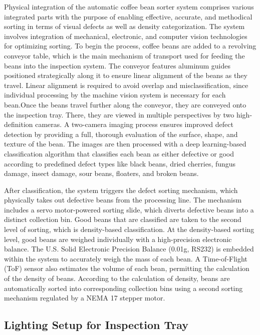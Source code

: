 Physical integration of the automatic coffee bean sorter system comprises various integrated parts with the purpose of enabling effective, accurate, and methodical sorting in terms of visual defects as well as density categorization. The system involves integration of mechanical, electronic, and computer vision technologies for optimizing sorting. To begin the process, coffee beans are added to a revolving conveyor table, which is the main mechanism of transport used for feeding the beans into the inspection system. The conveyor features aluminum guides positioned strategically along it to ensure linear alignment of the beans as they travel. Linear alignment is required to avoid overlap and misclassification, since individual processing by the machine vision system is necessary for each bean.Once the beans travel further along the conveyor, they are conveyed onto the inspection tray. There, they are viewed in multiple perspectives by two high-definition cameras. A two-camera imaging process ensures improved defect detection by providing a full, thorough evaluation of the surface, shape, and texture of the bean. The images are then processed with a deep learning-based classification algorithm that classifies each bean as either defective or good according to predefined defect types like black beans, dried cherries, fungus damage, insect damage, sour beans, floaters, and broken beans. 

After classification, the system triggers the defect sorting mechanism, which physically takes out defective beans from the processing line. The mechanism includes a servo motor-powered sorting slide, which diverts defective beans into a distinct collection bin. Good beans that are classified are taken to the second level of sorting, which is density-based classification. At the density-based sorting level, good beans are weighed individually with a high-precision electronic balance. The U.S. Solid Electronic Precision Balance (0.01g, RS232) is embedded within the system to accurately weigh the mass of each bean. A Time-of-Flight (ToF) sensor also estimates the volume of each bean, permitting the calculation of the density of beans. According to the calculation of density, beans are automatically sorted into corresponding collection bins using a second sorting mechanism regulated by a NEMA 17 stepper motor.

\subsection{Lighting Setup for Inspection Tray}

